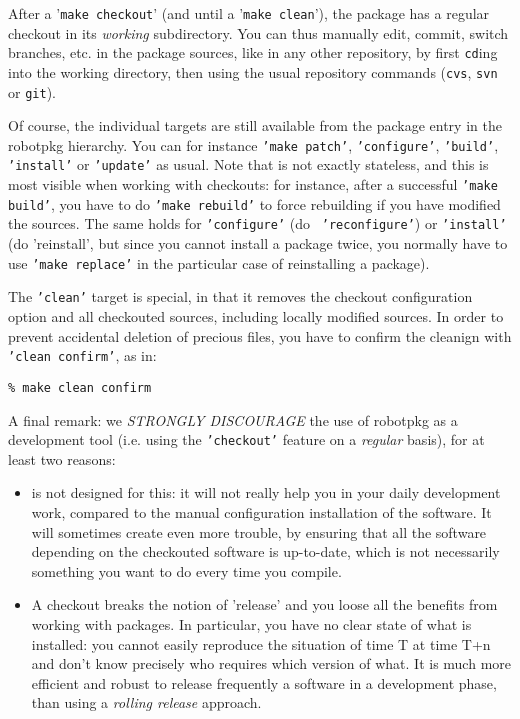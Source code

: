 After a '{\tt make checkout}' (and until a '{\tt make clean}'), the package has
a regular  checkout in its {\em  working} subdirectory.  You  can thus manually
edit, commit, switch branches, etc.  in  the package sources, like in any other
repository, by  first {\tt  cd}ing into the  working directory, then  using the
usual repository commands ({\tt cvs}, {\tt svn} or {\tt git}).

Of  course, the  individual  \robotpkg  targets are  still  available from  the
package  entry in  the robotpkg  hierarchy.  You  can for  instance  {\tt 'make
patch'}, {\tt 'configure'}, {\tt 'build'}, {\tt 'install'} or {\tt 'update'} as
usual. Note that  \robotpkg is not exactly stateless, and  this is most visible
when  working with  checkouts:  for  instance, after  a  successful {\tt  'make
build'}, you  have to do {\tt 'make  rebuild'} to force rebuilding  if you have
modified  the  sources.   The  same  holds  for  {\tt   'configure'}  (do  {\tt
'reconfigure'})  or {\tt  'install'} (do  {'reinstall'}, but  since  you cannot
install a package  twice, you normally have to use {\tt  'make replace'} in the
particular case of reinstalling a package).

The  {\tt  'clean'}  target  is  special,  in  that  it  removes  the  checkout
configuration  option and  all checkouted  sources, including  locally modified
sources. In order to prevent accidental deletion of precious files, you have to
confirm the cleanign with {\tt 'clean confirm'}, as in:

\begin{verbatim}
% make clean confirm
\end{verbatim}

A  final  remark:  we {\em  STRONGLY  DISCOURAGE}  the  use  of robotpkg  as  a
development tool  (i.e. using the {\tt  'checkout'} feature on  a {\em regular}
basis), for at least two reasons:

\begin{itemize}
   \item \robotpkg  is not designed  for this: it  will not really help  you in
   your  daily   development  work,   compared  to  the   manual  configuration
   installation of the software. It will sometimes create even more trouble, by
   ensuring  that all  the software  depending  on the  checkouted software  is
   up-to-date, which is not necessarily something you want to do every time you
   compile.

   \item  A checkout  breaks the  notion  of 'release'  and you  loose all  the
   benefits from working with packages.  In particular, you have no clear state
   of what is installed: you cannot easily reproduce the situation of time T at
   time T+n and don't know precisely  who requires which version of what. It is
   much  more  efficient and  robust  to release  frequently  a  software in  a
   development phase, than using a {\em rolling release} approach.
\end{itemize}

